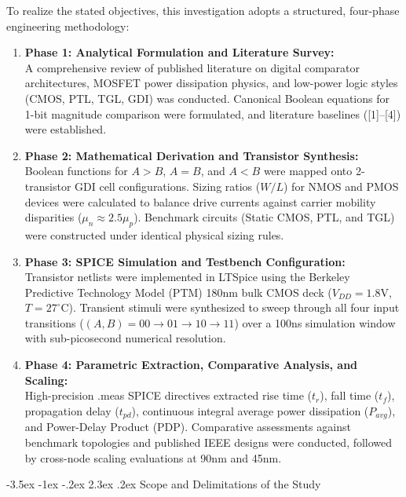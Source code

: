 \documentclass[12pt,a4paper,oneside]{report}
\makeatletter
\renewcommand\section{\@startsection {section}{1}{\z@}%
                                   {-3.5ex \@plus -1ex \@minus -.2ex}%
                                   {2.3ex \@plus.2ex}%
                                   {\normalfont\normalsize\bfseries}}
\makeatother
\begin{document}
To realize the stated objectives, this investigation adopts a structured, four-phase engineering methodology:
\begin{enumerate}
\item \textbf{Phase 1: Analytical Formulation and Literature Survey:}\\
A comprehensive review of published literature on digital comparator architectures, MOSFET power dissipation physics, and low-power logic styles (CMOS, PTL, TGL, GDI) was conducted. Canonical Boolean equations for 1-bit magnitude comparison were formulated, and literature baselines ([1]--[4]) were established.
\item \textbf{Phase 2: Mathematical Derivation and Transistor Synthesis:}\\
Boolean functions for $A>B$, $A=B$, and $A<B$ were mapped onto 2-transistor GDI cell configurations. Sizing ratios ($W/L$) for NMOS and PMOS devices were calculated to balance drive currents against carrier mobility disparities ($\mu_n \approx 2.5\mu_p$). Benchmark circuits (Static CMOS, PTL, and TGL) were constructed under identical physical sizing rules.
\item \textbf{Phase 3: SPICE Simulation and Testbench Configuration:}\\
Transistor netlists were implemented in LTSpice using the Berkeley Predictive Technology Model (PTM) 180nm bulk CMOS deck ($V_{DD} = 1.8\text{V}$, $T = 27^\circ\text{C}$). Transient stimuli were synthesized to sweep through all four input transitions ($(A,B) = 00 \rightarrow 01 \rightarrow 10 \rightarrow 11$) over a 100ns simulation window with sub-picosecond numerical resolution.
\item \textbf{Phase 4: Parametric Extraction, Comparative Analysis, and Scaling:}\\
High-precision .meas SPICE directives extracted rise time ($t_r$), fall time ($t_f$), propagation delay ($t_{pd}$), continuous integral average power dissipation ($P_{avg}$), and Power-Delay Product (PDP). Comparative assessments against benchmark topologies and published IEEE designs were conducted, followed by cross-node scaling evaluations at 90nm and 45nm.
\end{enumerate}

\section{Scope and Delimitations of the Study}
\end{document}
